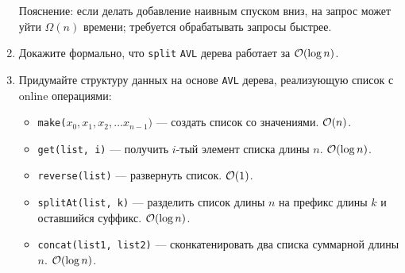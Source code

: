 \begin{enumerate}
    Пояснение: если делать добавление наивным спуском вниз, на запрос может уйти $\Omega(n)$ времени; требуется обрабатывать запросы быстрее.

  \item {}
    Докажите формально, что \texttt{split} \texttt{AVL} дерева работает за $\mathcal{O}(\log{n})$.

  \item
    Придумайте структуру данных на основе \texttt{AVL} дерева, реализующую список с online операциями:
    \begin{itemize}
      \item \texttt{make($x_0, x_1, x_2, \dots x_{n - 1})$} --- создать список со значениями. $\mathcal{O}(n)$.
      \item \texttt{get(list, i)} --- получить $i$-тый элемент списка длины $n$. $\mathcal{O}(\log{n})$.
      \item \texttt{reverse(list)} --- развернуть список. $\mathcal{O}(1)$.
      \item \texttt{splitAt(list, k)} --- разделить список длины $n$ на префикс длины $k$ и оставшийся суффикс. $\mathcal{O}(\log{n})$.
      \item \texttt{concat(list1, list2)} --- сконкатенировать два списка суммарной длины $n$. $\mathcal{O}(\log{n})$.
    \end{itemize}






\end{enumerate}